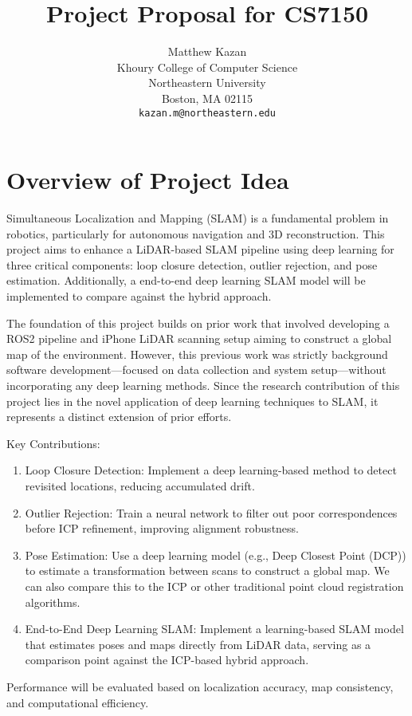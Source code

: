 \documentclass[nonanonymous]{article}
\title{Project Proposal for CS7150}
\author{
  Matthew Kazan \\
  Khoury College of Computer Science\\
  Northeastern University\\
  Boston, MA 02115 \\
  \texttt{kazan.m@northeastern.edu} \\
}
\begin{document}
\maketitle

\section{Overview of Project Idea}

Simultaneous Localization and Mapping (SLAM) is a fundamental problem in robotics,
particularly for autonomous navigation and 3D reconstruction.
This project aims to enhance a LiDAR-based SLAM pipeline using deep learning
for three critical components: loop closure detection, outlier rejection,
and pose estimation.
Additionally, a end-to-end deep learning SLAM model will be implemented to compare against
the hybrid approach.

The foundation of this project builds on prior work that involved developing a ROS2 pipeline
and iPhone LiDAR scanning setup aiming to construct a global map of the environment.
However, this previous work was strictly background software development—focused
on data collection and system setup—without incorporating any deep learning methods.
Since the research contribution of this project lies in the novel application of
deep learning techniques to SLAM, it represents a distinct extension of prior efforts.

Key Contributions:

\begin{enumerate}
\item Loop Closure Detection: Implement a deep learning-based method
to detect revisited locations, reducing accumulated drift.
\item Outlier Rejection: Train a neural network to filter out poor correspondences
before ICP refinement, improving alignment robustness.
\item Pose Estimation: Use a deep learning model (e.g., Deep Closest Point (DCP))
to estimate a transformation between scans to construct a global map.
We can also compare this to the ICP or other traditional point cloud registration algorithms.
\item End-to-End Deep Learning SLAM: Implement a learning-based SLAM model that estimates poses and
maps directly from LiDAR data, serving as a comparison point against the ICP-based hybrid approach.
\end{enumerate}
Performance will be evaluated based on localization accuracy, map consistency, and computational efficiency.
\end{document}
